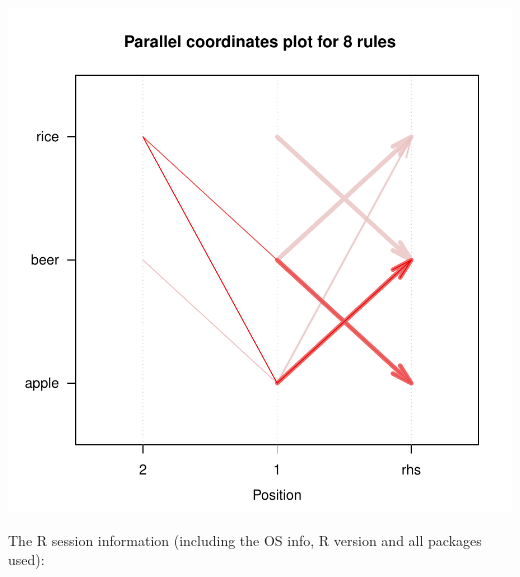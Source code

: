 \documentclass{article}\usepackage[]{graphicx}\usepackage[]{xcolor}
\newenvironment{knitrout}{}{} %
\begin{document}
\begin{knitrout}
{\centering \includegraphics[width=.6\linewidth]{figure/ARULES1-SOLUCION-Rnwauto-report-3} 

}


\end{knitrout}

The R session information (including the OS info, R version and all
packages used):
\end{document}
